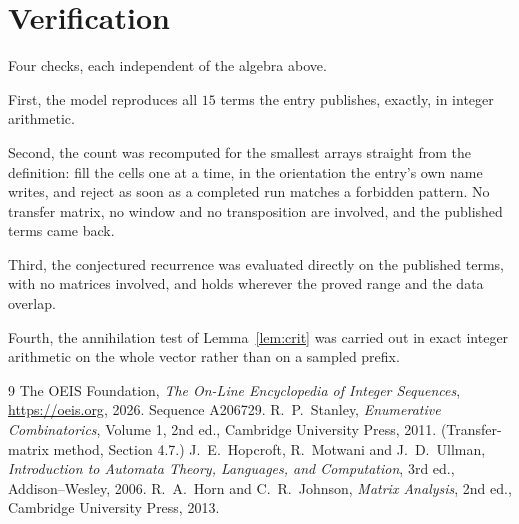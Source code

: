 \documentclass[11pt,a4paper]{article}
\theoremstyle{plain}
\theoremstyle{definition}
\begin{document}
\section{Verification}

Four checks, each independent of the algebra above.

First, the model reproduces all $15$ terms the entry publishes, exactly, in integer
arithmetic.

Second, the count was recomputed for the smallest arrays straight from the definition: fill the
cells one at a time, in the orientation the entry's own name writes, and reject as soon as a
completed run matches a forbidden pattern. No transfer matrix, no window and no transposition
are involved, and the published terms came back.

Third, the conjectured recurrence was evaluated directly on the published terms, with no
matrices involved, and holds wherever the proved range and the data overlap.

Fourth, the annihilation test of Lemma~\ref{lem:crit} was carried out in exact integer
arithmetic on the whole vector rather than on a sampled prefix.

\begin{thebibliography}{9}
 The OEIS Foundation, \emph{The On-Line Encyclopedia of Integer
Sequences}, \url{https://oeis.org}, 2026. Sequence A206729.
 R.~P.~Stanley, \emph{Enumerative Combinatorics}, Volume 1, 2nd ed.,
Cambridge University Press, 2011. (Transfer-matrix method, Section 4.7.)
 J.~E.~Hopcroft, R.~Motwani and J.~D.~Ullman, \emph{Introduction to Automata
Theory, Languages, and Computation}, 3rd ed., Addison--Wesley, 2006.
 R.~A.~Horn and C.~R.~Johnson, \emph{Matrix Analysis}, 2nd ed., Cambridge
University Press, 2013.
\end{thebibliography}
\end{document}
